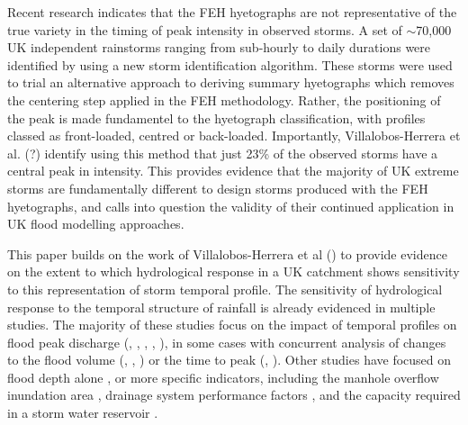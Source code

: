 \documentclass[APA,Times2COL]{WileyNJDv5}
\begin{document}

Recent research indicates that the FEH hyetographs are not representative of the true variety in the timing of peak intensity in observed storms. A set of $\sim$70,000 UK independent rainstorms ranging from sub-hourly to daily durations were identified by \citet{herrera2023creation} using a new storm identification algorithm. These storms were used to trial an alternative approach to deriving summary hyetographs which removes the centering step applied in the FEH methodology. Rather, the positioning of the peak is made fundamentel to the hyetograph classification, with profiles classed as front-loaded, centred or back-loaded. Importantly, Villalobos-Herrera et al. (?) identify using this method that just 23\% of the observed storms have a central peak in intensity. This provides evidence that the majority of UK extreme storms are fundamentally different to design storms produced with the FEH hyetographs, and calls into question the validity of their continued application in UK flood modelling approaches. 



This paper builds on the work of Villalobos-Herrera et al () to provide evidence on the extent to which hydrological response in a UK catchment shows sensitivity to this representation of storm temporal profile. The sensitivity of hydrological response to the temporal structure of rainfall is already evidenced in multiple studies. The majority of these studies focus on the impact of temporal profiles on flood peak discharge (\citet{fatone2021advanced}, \citet{dullo2017evaluation}, \citet{maca2009influence}, \citet{fadhel2018sensitivity}, \citet{wasko2015steeper}), in some cases with concurrent analysis of changes to the flood volume (\citet{lambourne1987model}, \citet{nguyen2010optimal}, \citet{peyron2002optimal}) or the time to peak (\citet{balbastre2019comparison}, \citet{ball1992influence}). Other studies have focused on flood depth alone \citep{hettiarachchi2018increase}, or more specific indicators, including the manhole overflow inundation area \citep{li2021case}, drainage system performance factors \citep{ng2020design}, and the capacity required in a storm water reservoir  \citep{pochwat2017temporal}. 
\end{document}
